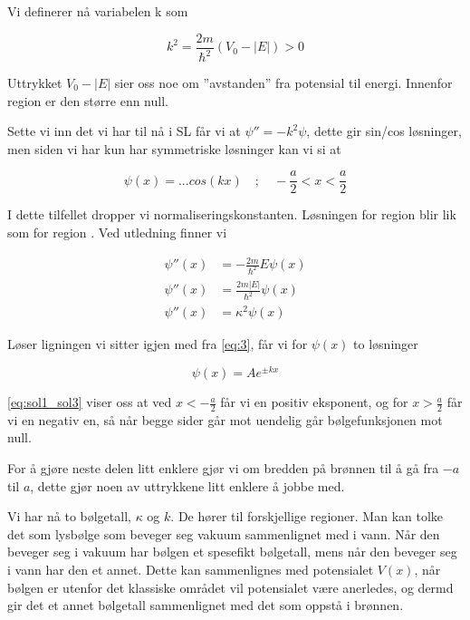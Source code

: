 Vi definerer nå variabelen k som 

\begin{equation}
\label{eq:k_endelig}
    k^2 = \frac{2m}{\hbar^2}(V_0-|E|) > 0
\end{equation}

Uttrykket $V_0-|E|$ sier oss noe om ''avstanden'' fra potensial til energi. Innenfor region  er den større enn null.

Sette vi inn det vi har til nå i SL får vi at $\psi'' = -k^2\psi$, dette gir sin/cos løsninger, men siden vi har kun har symmetriske løsninger kan vi si at

\begin{equation}
    \psi(x) = ... cos(kx) \quad ; \quad -\frac{a}{2} < x < \frac{a}{2}
\end{equation}

I dette tilfellet dropper vi normaliseringskonstanten. Løsningen for region  blir lik som for region . Ved utledning finner vi

\begin{equation}
\label{eq:3}
\begin{split}
    \psi''(x) &= -\frac{2m}{\hbar^2}E\psi(x) \\
    \psi''(x) &= \frac{2m|E|}{\hbar^2}\psi(x) \\
    \psi''(x) &= \kappa^2\psi(x)
\end{split}
\end{equation}

Løser ligningen vi sitter igjen med fra \ref{eq:3}, får vi for $\psi(x)$ to løsninger

\begin{equation}
    \label{eq:sol1_sol3}
    \psi(x) = Ae^{\pm kx}
\end{equation}

\autoref{eq:sol1_sol3} viser oss at ved $x<-\frac{a}{2}$ får vi en positiv eksponent, og for $x>\frac{a}{2}$ får vi en negativ en, så når begge sider går mot uendelig går bølgefunksjonen mot null.

For å gjøre neste delen litt enklere gjør vi om bredden på brønnen til å gå fra $-a$ til $a$, dette gjør noen av uttrykkene litt enklere å jobbe med. 

Vi har nå to bølgetall, $\kappa$ og $k$. De hører til forskjellige regioner. Man kan tolke det som lysbølge som beveger seg  vakuum sammenlignet med i vann. Når den beveger seg i vakuum har bølgen et spesefikt bølgetall, mens når den beveger seg i vann har den et annet. Dette kan sammenlignes med potensialet $V(x)$, når bølgen er utenfor det klassiske området vil potensialet være anerledes, og dermd gir det et annet bølgetall sammenlignet med det som oppstå i brønnen.

